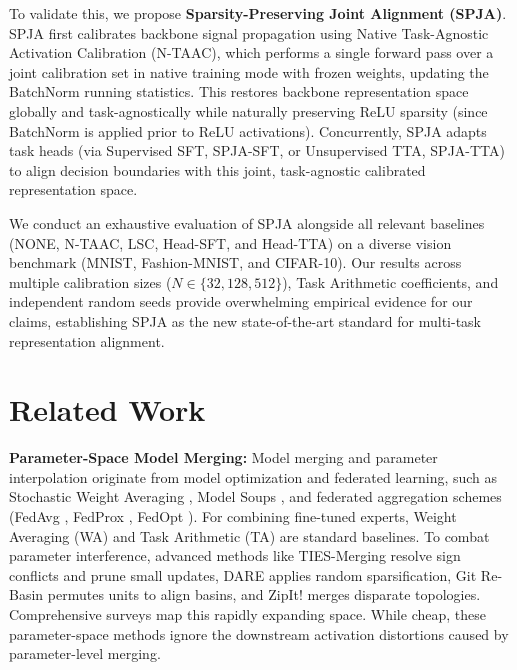 \documentclass{article}
\theoremstyle{plain}
\theoremstyle{definition}
\theoremstyle{remark}
\begin{document}
To validate this, we propose \textbf{Sparsity-Preserving Joint Alignment (SPJA)}. SPJA first calibrates backbone signal propagation using Native Task-Agnostic Activation Calibration (N-TAAC), which performs a single forward pass over a joint calibration set in native training mode with frozen weights, updating the BatchNorm running statistics. This restores backbone representation space globally and task-agnostically while naturally preserving ReLU sparsity (since BatchNorm is applied prior to ReLU activations). Concurrently, SPJA adapts task heads (via Supervised SFT, SPJA-SFT, or Unsupervised TTA, SPJA-TTA) to align decision boundaries with this joint, task-agnostic calibrated representation space.

We conduct an exhaustive evaluation of SPJA alongside all relevant baselines (NONE, N-TAAC, LSC, Head-SFT, and Head-TTA) on a diverse vision benchmark (MNIST, Fashion-MNIST, and CIFAR-10). Our results across multiple calibration sizes ($N \in \{32, 128, 512\}$), Task Arithmetic coefficients, and independent random seeds provide overwhelming empirical evidence for our claims, establishing SPJA as the new state-of-the-art standard for multi-task representation alignment.

\section{Related Work}
\textbf{Parameter-Space Model Merging:} Model merging and parameter interpolation originate from model optimization and federated learning, such as Stochastic Weight Averaging \cite{izmailov2018averaging}, Model Soups \cite{wortsman2022model}, and federated aggregation schemes (FedAvg \cite{fedavg2017}, FedProx \cite{li2020federated}, FedOpt \cite{reddi2020adaptive}). For combining fine-tuned experts, Weight Averaging (WA) and Task Arithmetic (TA) \cite{ilharco2022editing} are standard baselines. To combat parameter interference, advanced methods like TIES-Merging \cite{yadav2023ties} resolve sign conflicts and prune small updates, DARE \cite{yu2024language} applies random sparsification, Git Re-Basin \cite{ainsworth2022git} permutes units to align basins, and ZipIt! \cite{stoica2023zipit} merges disparate topologies. Comprehensive surveys \cite{yang2024survey, khan2024deep, wang2024scaling} map this rapidly expanding space. While cheap, these parameter-space methods ignore the downstream activation distortions caused by parameter-level merging.
\end{document}
